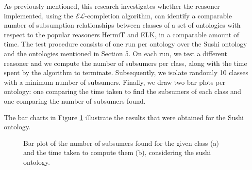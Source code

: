 \documentclass[a4paper]{article}
\theoremstyle{plain}
\theoremstyle{definition}
\begin{document}
    
    As previously mentioned, this research investigates whether the reasoner implemented, using the $\mathcal{EL}$-completion algorithm, can identify a comparable number of subsumption relationships between classes of a set of ontologies with respect to the popular reasoners HermiT and ELK, in a comparable amount of time. The test procedure consists of one run per ontology over the Sushi ontology and the ontologies mentioned in Section 5. On each run, we test a different reasoner and we compute the number of subsumers per class, along with the time spent by the algorithm to terminate. Subsequently, we isolate randomly 10 classes with a minimum number of subsumers. Finally, we draw two bar plots per ontology: one comparing the time taken to find the subsumers of each class and one comparing the number of subsumers found.

    The bar charts in Figure \ref{fig:sushi} illustrate the results that were obtained for the Sushi ontology.
    \begin{figure}[h!]
        \centering
        \hspace{5mm} %
        \caption{Bar plot of the number of subsumers found for the given class (a) and the time taken to compute them (b), considering the sushi ontology.}
        \label{fig:sushi}
    \end{figure}
\end{document}
